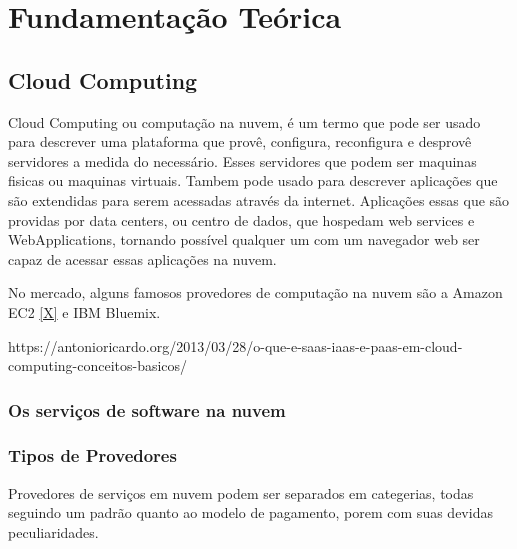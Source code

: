 \chapter{Fundamentação Teórica}
\section{Cloud Computing}
	Cloud Computing ou computação na nuvem, é um termo que pode ser usado para descrever uma plataforma que provê, configura, reconfigura e desprovê servidores a medida do necessário. Esses servidores que podem ser maquinas fisicas ou maquinas virtuais. Tambem pode usado para descrever aplicações que são extendidas para serem acessadas através da internet. Aplicações essas que são providas por data centers, ou centro de dados, que hospedam web services e WebApplications, tornando possível qualquer um com um navegador web ser capaz de acessar essas aplicações na nuvem.
	
	No mercado, alguns famosos provedores de computação na nuvem são a Amazon EC2 \ref{X} e IBM Bluemix.
	
	https://antonioricardo.org/2013/03/28/o-que-e-saas-iaas-e-paas-em-cloud-computing-conceitos-basicos/

	\subsection{Os serviços de software na nuvem}
	

	\subsection{Tipos de Provedores} 
		Provedores de serviços em nuvem podem ser separados em categerias, todas seguindo um padrão quanto ao modelo de pagamento, porem com suas devidas peculiaridades.

